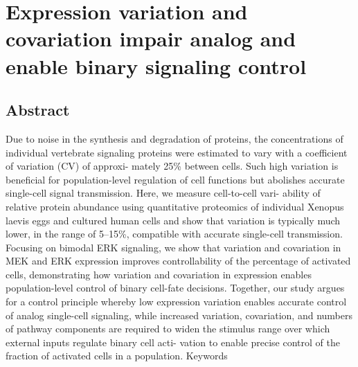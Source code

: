 \chapter{Expression variation and covariation impair analog and enable binary signaling control}

\section{Abstract}
Due to noise in the synthesis and degradation of proteins, the concentrations of individual vertebrate signaling proteins were estimated to vary with a coefficient of variation (CV) of approxi- mately 25\% between cells. Such high variation is beneficial for population-level regulation of cell functions but abolishes accurate single-cell signal transmission. Here, we measure cell-to-cell vari- ability of relative protein abundance using quantitative proteomics of individual Xenopus laevis eggs and cultured human cells and show that variation is typically much lower, in the range of 5–15\%, compatible with accurate single-cell transmission. Focusing on bimodal ERK signaling, we show that variation and covariation in MEK and ERK expression improves controllability of the percentage of activated cells, demonstrating how variation and covariation in expression enables population-level control of binary cell-fate decisions. Together, our study argues for a control principle whereby low expression variation enables accurate control of analog single-cell signaling, while increased variation, covariation, and numbers of pathway components are required to widen the stimulus range over which external inputs regulate binary cell acti- vation to enable precise control of the fraction of activated cells in a population.
Keywords

